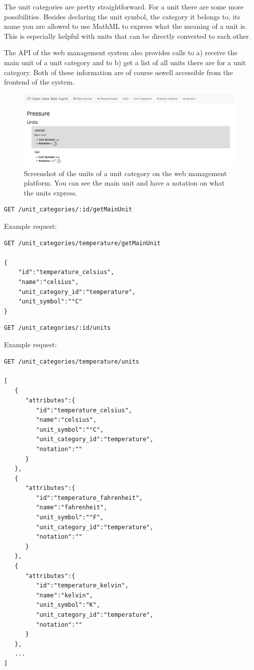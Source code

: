 The unit categories are pretty straightforward. For a unit there are
some more possibilities. Besides declaring the unit symbol, the category
it belongs to, its name you are allowed to use MathML to express what
the meaning of a unit is. This is especially helpful with units that can
be directly converted to each other.

The API of the web management system also provides calls to a) receive
the main unit of a unit category and to b) get a list of all units there
are for a unit category. Both of these information are of course aswell
accessible from the frontend of the system.

\begin{figure}[b]
	\includegraphics[width=1.00\textwidth]{images/unit_frontend.png}
	\caption{Screenshot of the units of a unit category on the web management platform. You can see the main unit and have a notation on what the units express.}
	\label{fig:screen-units}
\end{figure}

\begin{verbatim}
GET /unit_categories/:id/getMainUnit
\end{verbatim}

Example request:

\begin{verbatim}
GET /unit_categories/temperature/getMainUnit

{
    "id":"temperature_celsius",
    "name":"celsius",
    "unit_category_id":"temperature",
    "unit_symbol":"°C"
}
\end{verbatim}

\begin{verbatim}
GET /unit_categories/:id/units
\end{verbatim}

Example request:

\begin{verbatim}
GET /unit_categories/temperature/units

[
   {
      "attributes":{
         "id":"temperature_celsius",
         "name":"celsius",
         "unit_symbol":"°C",
         "unit_category_id":"temperature",
         "notation":""
      }
   },
   {
      "attributes":{
         "id":"temperature_fahrenheit",
         "name":"fahrenheit",
         "unit_symbol":"°F",
         "unit_category_id":"temperature",
         "notation":""
      }
   },
   {
      "attributes":{
         "id":"temperature_kelvin",
         "name":"kelvin",
         "unit_symbol":"K",
         "unit_category_id":"temperature",
         "notation":""
      }
   },
   ...
]
\end{verbatim}

